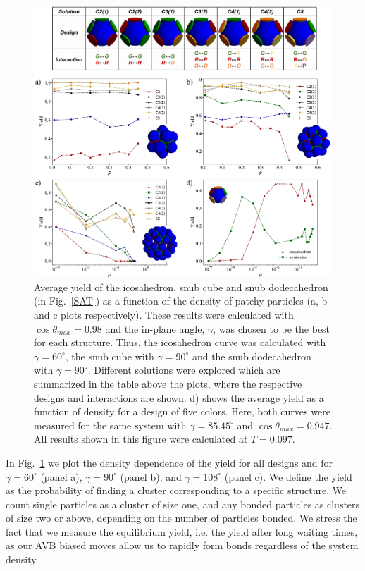 \documentclass[a4paper, amsfonts, amssymb, amsmath, reprint, showkeys, nofootinbib, oneside]{revtex4-1}
\begin{document}
\begin{figure}[t]
	\includegraphics{fig4.pdf}
	\caption{\label{Yield} Average yield of the icosahedron, snub cube and snub dodecahedron (in Fig.~\ref{SAT}) as a function of the density of patchy particles (a, b and c plots respectively). These results were calculated with $\cos\theta_{max}=0.98$ and the in-plane angle, $\gamma$, was chosen to be the best for each structure. Thus, the icosahedron curve was calculated with $\gamma=60^\circ$, the snub cube with $\gamma=90^\circ$ and the snub dodecahedron with $\gamma=90^\circ$. Different solutions were explored which are summarized in the table above the plots, where the respective designs and interactions are shown. d) shows the average yield as a function of density for a design of five colors. Here, both curves were measured for the same system with $\gamma=85.45^\circ$ and $\cos\theta_{max}=0.947$. All results shown in this figure were calculated at $T=0.097$.}
\end{figure}

In Fig.~\ref{Yield} we plot the density dependence of the yield for all designs and for $\gamma=60^\circ$ (panel a), $\gamma=90^\circ$ (panel b), and $\gamma=108^\circ$ (panel c).
We define the yield as the probability of finding a cluster corresponding to a specific structure. We count single particles as a cluster of size one, and any bonded particles as clusters of size two or above, depending on the number of particles bonded.
We stress the fact that we measure the equilibrium yield, i.e. the yield after long waiting times, as our AVB biased moves allow us to rapidly form bonds regardless of the system density.
\end{document}
